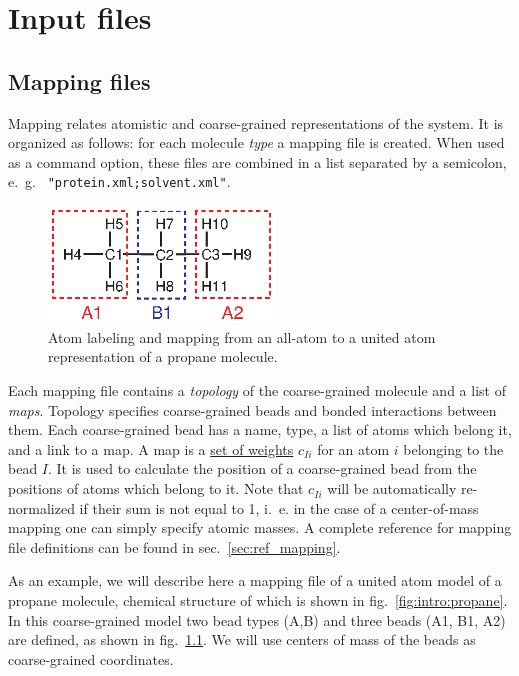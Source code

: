 \chapter{Input files}
\label{sec:inputfiles}

\section{Mapping files}
\label{sec:mapping_files}

Mapping relates atomistic and coarse-grained representations of the system. It is organized as follows: for each molecule {\em type} a mapping file is created. When used as a command option, these files are combined in a list separated by a semicolon, e.~g. ~\texttt{"protein.xml;solvent.xml"}.

\begin{figure}
  \includegraphics[width=6cm]{usage/fig/propane}
  \caption{Atom labeling and mapping from an all-atom to a united atom representation of a propane molecule.
  \label{fig:propane_map}
}
\end{figure}

Each mapping file contains a {\em topology} of the coarse-grained molecule and a list of {\em maps}. Topology specifies coarse-grained beads and bonded interactions between them. Each coarse-grained bead has a name, type, a list of atoms which belong it, and a link to a map. A map is a \hyperref[sec:mapping_operator]{set of weights} $c_{Ii}$ for an atom $i$ belonging to the bead $I$. It is used to calculate the position of a coarse-grained bead from the positions of atoms which belong to it. Note that $c_{Ii}$ will be automatically re-normalized if their sum is not equal to 1, i.~e. in the case of a center-of-mass mapping one can simply specify atomic masses.
A complete reference for mapping file definitions can be found in sec.~\ref{sec:ref_mapping}.

As an example, we will describe here a mapping file of a united atom model of a propane molecule, chemical structure of which is shown in fig.~\ref{fig:intro:propane}. In this coarse-grained model two bead types (A,B) and three beads (A1, B1, A2) are defined, as shown in fig.~\ref{fig:propane_map}. We will use centers of mass of the beads as  coarse-grained coordinates.

